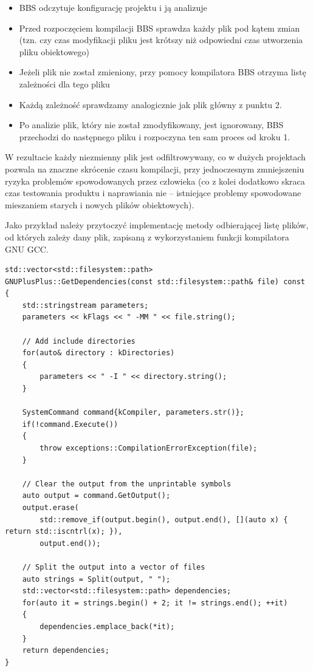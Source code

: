 \begin{itemize}
    \item BBS odczytuje konfigurację projektu i ją analizuje
    \item Przed rozpoczęciem kompilacji BBS sprawdza każdy plik pod kątem zmian (tzn. czy czas modyfikacji pliku jest krótszy niż odpowiedni czas utworzenia pliku obiektowego)
    \item Jeżeli plik nie został zmieniony, przy pomocy kompilatora BBS otrzyma listę zależności dla tego pliku
    \item Każdą zależność sprawdzamy analogicznie jak plik główny z punktu 2.
    \item Po analizie plik, który nie został zmodyfikowany, jest ignorowany, BBS przechodzi do następnego pliku i rozpoczyna ten sam proces od kroku 1.
\end{itemize}

W rezultacie każdy niezmienny plik jest odfiltrowywany, co w dużych projektach pozwala na znaczne skrócenie czasu kompilacji, przy jednoczesnym zmniejszeniu ryzyka problemów spowodowanych przez człowieka (co z kolei dodatkowo skraca czas testowania produktu i naprawiania nie -- istniejące problemy spowodowane mieszaniem starych i nowych plików obiektowych).

Jako przykład należy przytoczyć implementację metody odbierającej listę plików, od których zależy dany plik, zapisaną z wykorzystaniem funkcji kompilatora GNU GCC.

\begin{lstlisting}[label=list:dependencies,caption=Implementacja metody GNUPlusPlus::GetDependencies(),basicstyle=\footnotesize\ttfamily]
std::vector<std::filesystem::path>
GNUPlusPlus::GetDependencies(const std::filesystem::path& file) const
{
	std::stringstream parameters;
	parameters << kFlags << " -MM " << file.string();

	// Add include directories
	for(auto& directory : kDirectories)
	{
		parameters << " -I " << directory.string();
	}

	SystemCommand command{kCompiler, parameters.str()};
	if(!command.Execute())
	{
		throw exceptions::CompilationErrorException(file);
	}

	// Clear the output from the unprintable symbols
	auto output = command.GetOutput();
	output.erase(
		std::remove_if(output.begin(), output.end(), [](auto x) { return std::iscntrl(x); }),
		output.end());

	// Split the output into a vector of files
	auto strings = Split(output, " ");
	std::vector<std::filesystem::path> dependencies;
	for(auto it = strings.begin() + 2; it != strings.end(); ++it)
	{
		dependencies.emplace_back(*it);
	}
	return dependencies;
}
\end{lstlisting}

